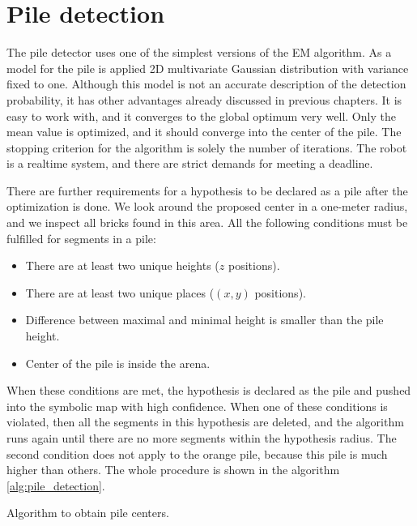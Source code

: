 \section{Pile detection}
\label{sec:pile_detector}
The pile detector uses one of the simplest versions of the EM algorithm. As a model for the pile is applied 2D multivariate Gaussian distribution with variance fixed to one. Although this model is not an accurate description of the detection probability, it has other advantages already discussed in previous chapters. It is easy to work with, and it converges to the global optimum very well. Only the mean value is optimized, and it should converge into the center of the pile. The stopping criterion for the algorithm is solely the number of iterations. The robot is a realtime system, and there are strict demands for meeting a deadline. 

There are further requirements for a hypothesis to be declared as a pile after the optimization is done. We look around the proposed center in a one-meter radius, and we inspect all bricks found in this area. All the following conditions must be fulfilled for segments in a pile:
\begin{itemize}
\item There are at least two unique heights ($z$ positions).
\item There are at least two unique places ($(x,y)$ positions).
\item Difference between maximal and minimal height is smaller than the pile height.
\item Center of the pile is inside the arena.
\end{itemize}
When these conditions are met, the hypothesis is declared as the pile and pushed into the symbolic map with high confidence. When one of these conditions is violated, then all the segments in this hypothesis are deleted, and the algorithm runs again until there are no more segments within the hypothesis radius. The second condition does not apply to the orange pile, because this pile is much higher than others. The whole procedure is shown in the algorithm \ref{alg:pile_detection}.
\begin{algorithm}[]
 \caption{Algorithm to obtain pile centers.}
 \label{alg:pile_detection}
\end{algorithm}

